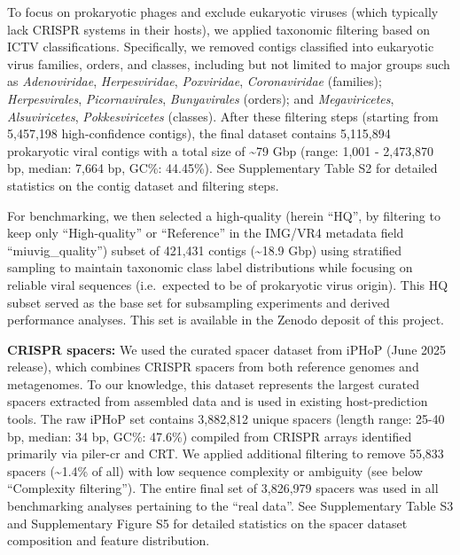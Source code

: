 \documentclass[
]{article}
\begin{document}
To focus on prokaryotic phages and exclude eukaryotic viruses (which
typically lack CRISPR systems in their hosts), we applied taxonomic
filtering based on ICTV classifications. Specifically, we removed
contigs classified into eukaryotic virus families, orders, and classes,
including but not limited to major groups such as \emph{Adenoviridae},
\emph{Herpesviridae}, \emph{Poxviridae}, \emph{Coronaviridae}
(families); \emph{Herpesvirales}, \emph{Picornavirales},
\emph{Bunyavirales} (orders); and \emph{Megaviricetes},
\emph{Alsuviricetes}, \emph{Pokkesviricetes} (classes). After these
filtering steps (starting from 5,457,198 high-confidence contigs), the
final dataset contains 5,115,894 prokaryotic viral contigs with a total
size of \textasciitilde79 Gbp (range: 1,001 - 2,473,870 bp, median:
7,664 bp, GC\%: 44.45\%). See Supplementary Table S2 for detailed
statistics on the contig dataset and filtering steps.

For benchmarking, we then selected a high-quality (herein ``HQ'', by
filtering to keep only ``High-quality'' or ``Reference'' in the IMG/VR4
metadata field ``miuvig\_quality'') subset of 421,431 contigs
(\textasciitilde18.9 Gbp) using stratified sampling to maintain
taxonomic class label distributions while focusing on reliable viral
sequences (i.e.~expected to be of prokaryotic virus origin). This HQ
subset served as the base set for subsampling experiments and derived
performance analyses. This set is available in the Zenodo deposit of
this project\autocite{zenodo_doi}.

\textbf{CRISPR spacers:} We used the curated spacer dataset from iPHoP
(June 2025 release)\autocite{Roux2023_iphop}, which combines CRISPR
spacers from both reference genomes and metagenomes. To our knowledge,
this dataset represents the largest curated spacers extracted from
assembled data and is used in existing host-prediction tools. The raw
iPHoP set contains 3,882,812 unique spacers (length range: 25-40 bp,
median: 34 bp, GC\%: 47.6\%) compiled from CRISPR arrays identified
primarily via piler-cr\autocite{edgar_piler_cr_2007} and
CRT\autocite{bland_crt_2007}. We applied additional filtering to remove
55,833 spacers (\textasciitilde1.4\% of all) with low sequence
complexity or ambiguity (see below ``Complexity filtering''). The entire
final set of 3,826,979 spacers was used in all benchmarking analyses
pertaining to the ``real data''. See Supplementary Table S3 and
Supplementary Figure S5 for detailed statistics on the spacer dataset
composition and feature distribution.
\end{document}
